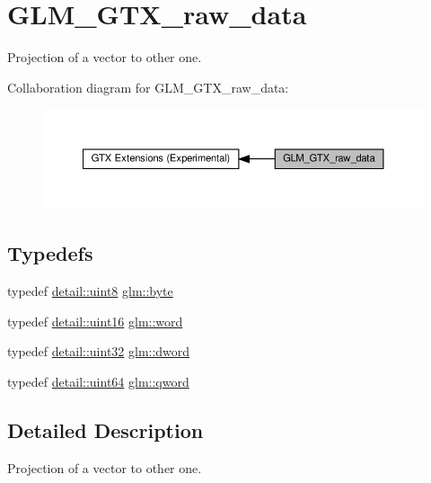 \hypertarget{group__gtx__raw__data}{}\section{G\+L\+M\+\_\+\+G\+T\+X\+\_\+raw\+\_\+data}
\label{group__gtx__raw__data}


Projection of a vector to other one.  


Collaboration diagram for G\+L\+M\+\_\+\+G\+T\+X\+\_\+raw\+\_\+data\+:\nopagebreak
\begin{figure}[H]
\begin{center}
\leavevmode
\includegraphics[width=350pt]{group__gtx__raw__data}
\end{center}
\end{figure}
\subsection*{Typedefs}
\begin{DoxyCompactItemize}
\item 
typedef \hyperlink{namespaceglm_1_1detail_aef2588f97d090cc19fbbe0c74fe17c8f}{detail\+::uint8} \hyperlink{group__gtx__raw__data_gacd7fe1f2ad60a57f7d7ad4f1e6836efd}{glm\+::byte}
\item 
typedef \hyperlink{namespaceglm_1_1detail_a47b2a7d006d187338e8031a352d1ce56}{detail\+::uint16} \hyperlink{group__gtx__raw__data_ga5617a479d471021b5c773c5e969ba46d}{glm\+::word}
\item 
typedef \hyperlink{namespaceglm_1_1detail_ade6cfbf377022aaa391af8cd50489222}{detail\+::uint32} \hyperlink{group__gtx__raw__data_ga1fc2589df6d44e923cd1820cf14805cf}{glm\+::dword}
\item 
typedef \hyperlink{namespaceglm_1_1detail_adec4b19bf4982125e122db2fe03c5810}{detail\+::uint64} \hyperlink{group__gtx__raw__data_ga32447af289e879589883c9b7e3be1246}{glm\+::qword}
\end{DoxyCompactItemize}


\subsection{Detailed Description}
Projection of a vector to other one. 


